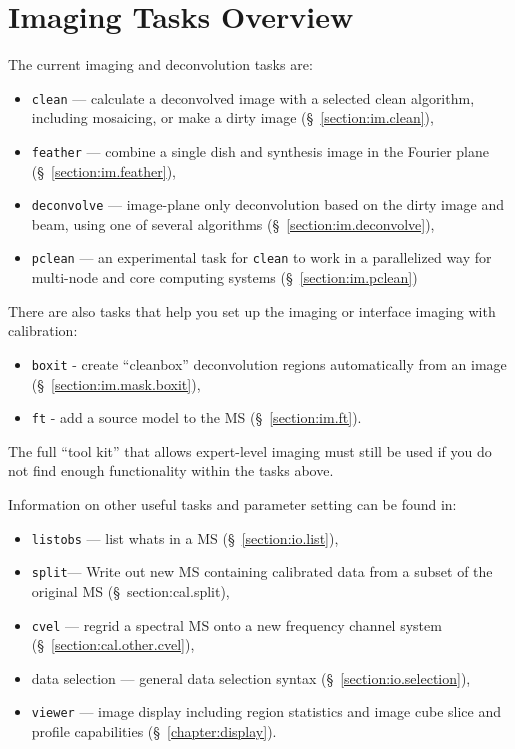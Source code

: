 \section{Imaging Tasks Overview}
\label{section:im.tasks}

The current imaging and deconvolution tasks are:
\begin{itemize}
   \item {\tt clean} --- calculate a deconvolved image with a selected clean
         algorithm, including mosaicing, or make a dirty image
         (\S~\ref{section:im.clean}),
   \item {\tt feather} --- combine a single dish and synthesis image in the
         Fourier plane (\S~\ref{section:im.feather}),
   \item {\tt deconvolve} --- image-plane only deconvolution based on
         the dirty image and beam, using one of several algorithms
         (\S~\ref{section:im.deconvolve}),
   \item {\tt pclean} --- an experimental task for {\tt clean} to work
     in a parallelized way for multi-node and core computing systems
          (\S~\ref{section:im.pclean})
\end{itemize}

There are also tasks that help you set up the imaging or interface
imaging with calibration:

\begin{itemize}
   \item {\tt boxit} - create ``cleanbox'' deconvolution regions automatically
         from an image
	 (\S~\ref{section:im.mask.boxit}),
   \item {\tt ft} - add a source model to the MS (\S~\ref{section:im.ft}).
\end{itemize}

The full ``tool kit'' that allows expert-level imaging must still be
used if you do not find enough functionality within the tasks above. 

Information on other useful tasks and parameter setting can be found in:
\begin{itemize}
   \item {\tt listobs} --- list whats in a MS (\S~\ref{section:io.list}),
   \item {\tt split}--- Write out new MS containing calibrated data
      from a subset of the original MS (\S~{section:cal.split}),
   \item {\tt cvel} --- regrid a spectral MS onto a new frequency
      channel system
      (\S~\ref{section:cal.other.cvel}),
   \item data selection --- general data selection syntax
      (\S~\ref{section:io.selection}),
   \item {\tt viewer} --- image display including region statistics and
         image cube slice and profile capabilities
         (\S~\ref{chapter:display}).
\end{itemize}

